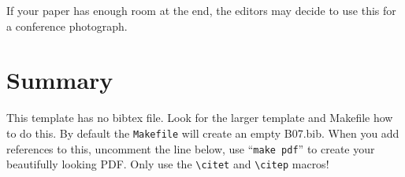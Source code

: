 \documentclass[11pt,twoside]{article}
\begin{document}
If your paper has enough room at the end, the editors may decide to use this
for a conference photograph.

\section{Summary}

This template has no bibtex file.  Look for the larger template and
Makefile how to do this. By default the {\tt Makefile} will create an
empty B07.bib. When you add references to this, uncomment the
line \verb++ below, use ``{\tt make pdf}'' to create
your beautifully looking PDF. Only use the
\verb"\citet" and \verb"\citep" macros!






\end{document}

